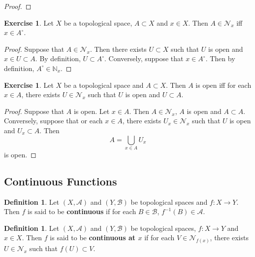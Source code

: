 \documentclass[12pt]{amsart}
\theoremstyle{definition}
\newtheorem{defn}[definition]{Definition}
\newtheorem{ex}[definition]{Exercise}
\newcommand{\N}{\mathbb{N}}
\newcommand{\MA}{\mathcal{A}}
\newcommand{\MB}{\mathcal{B}}
\newcommand{\MN}{\mathcal{N}}
\newcommand{\lex}[1]{\label{ex:#1}}
\newcommand{\ld}[1]{\label{defn:#1}}
\begin{document}
	\begin{proof}
	
	\end{proof}
	
	
	\begin{ex} \lex{}
	Let $X$ be a topological space, $A \subset X$ and $x \in X$. Then $A \in \MN_x$ iff $x \in A^{\circ}$.
	\end{ex}
	
	\begin{proof}
	Suppose that $A \in \MN_x$. Then there exists $U \subset X$ such that $U$ is open and $x \in U \subset A$. By definition, $U \subset A^{\circ}$. Conversely, suppose that $x \in A^{\circ}$. Then by definition, $A^{\circ} \in \N_x$.
	\end{proof}
	
	\begin{ex} \lex{}
	Let $X$ be a topological space and $A \subset X$. Then $A$ is open iff for each $x \in A$, there exists $U \in \MN_x$ such that $U$ is open and $U \subset A$.
	\end{ex}
	
	\begin{proof}
	Suppose that $A$ is open. Let $x \in A$. Then $A \in \MN_x$, $A$ is open and $A \subset A$. Conversely, suppose that or each $x \in A$, there exists $U_x \in \MN_x$ such that $U$ is open and $U_x \subset A$. Then $$A = \bigcup\limits_{x \in A}U_x$$ is open. 
	\end{proof}
	
	
	
	
	
	
	
	
	
	
	
	
	
	
	\newpage
	\subsection{Continuous Functions}	
	
	\begin{defn} \ld{}
	Let $(X,\MA)$ and $(Y,\MB)$ be topological spaces and $f:X \rightarrow Y$. Then $f$ is said to be \textbf{continuous} if for each $B \in \MB$, $f^{-1}(B) \in \MA$.
	\end{defn}
	
	\begin{defn} \ld{}
	Let $(X,\MA)$ and $(Y,\MB)$ be topological spaces, $f:X \rightarrow Y$ and $x \in X$. Then $f$ is said to be \textbf{continuous at $x$} if for each $V \in \MN_{f(x)}$, there exists $U \in \MN_x$ such that $f(U) \subset V$. 
	\end{defn}		
	
\end{document}

